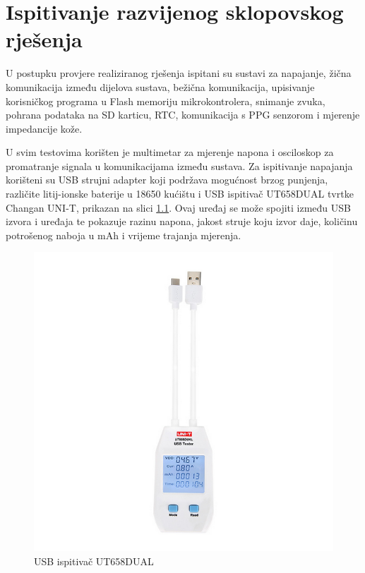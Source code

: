 \chapter{Ispitivanje razvijenog sklopovskog rješenja}
U postupku provjere realiziranog rješenja ispitani su sustavi za napajanje, žična komunikacija između dijelova sustava, bežična komunikacija, upisivanje korisničkog programa u Flash memoriju mikrokontrolera, snimanje zvuka, pohrana podataka na SD karticu, RTC, komunikacija s PPG senzorom i mjerenje impedancije kože.

U svim testovima korišten je multimetar za mjerenje napona i osciloskop za promatranje signala u komunikacijama između sustava. Za ispitivanje napajanja korišteni su USB strujni adapter koji podržava mogućnost brzog punjenja, različite litij-ionske baterije u 18650 kućištu i USB ispitivač UT658DUAL tvrtke Changan UNI-T, prikazan na slici \ref{slk:UT658DUAL}. Ovaj uređaj se može spojiti između USB izvora i uređaja te pokazuje razinu napona, jakost struje koju izvor daje, količinu potrošenog naboja u mAh i vrijeme trajanja mjerenja.
\begin{figure}[htb]
    \centering
    \includegraphics[width=6 cm]{Figures/UT658DUAL.png}
    \caption{USB ispitivač UT658DUAL}
    \label{slk:UT658DUAL}
\end{figure}
